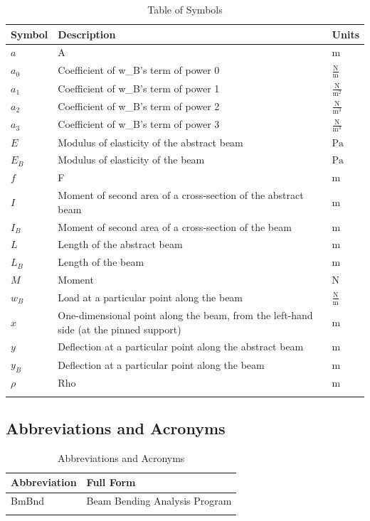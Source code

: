 \documentclass[12pt]{article}
\begin{document}
\begin{longtabu}{l X[l] l}
\toprule
\textbf{Symbol} & \textbf{Description} & \textbf{Units}
\\
\midrule
\endhead
$a$ & A & ${\text{m}}$
\\
${a_{\text{0}}}$ & Coefficient of w\_B's term of power 0 & $\frac{\text{N}}{\text{m}}$
\\
${a_{\text{1}}}$ & Coefficient of w\_B's term of power 1 & $\frac{\text{N}}{\text{m}^{2}}$
\\
${a_{\text{2}}}$ & Coefficient of w\_B's term of power 2 & $\frac{\text{N}}{\text{m}^{3}}$
\\
${a_{\text{3}}}$ & Coefficient of w\_B's term of power 3 & $\frac{\text{N}}{\text{m}^{4}}$
\\
$E$ & Modulus of elasticity of the abstract beam & ${\text{Pa}}$
\\
${E_{B}}$ & Modulus of elasticity of the beam & ${\text{Pa}}$
\\
$f$ & F & ${\text{m}}$
\\
$I$ & Moment of second area of a cross-section of the abstract beam & ${\text{m}}$
\\
${I_{B}}$ & Moment of second area of a cross-section of the beam & ${\text{m}}$
\\
$L$ & Length of the abstract beam & ${\text{m}}$
\\
${L_{B}}$ & Length of the beam & ${\text{m}}$
\\
$M$ & Moment & ${\text{N}}$
\\
${w_{B}}$ & Load at a particular point along the beam & $\frac{\text{N}}{\text{m}}$
\\
$x$ & One-dimensional point along the beam, from the left-hand side (at the pinned support) & ${\text{m}}$
\\
$y$ & Deflection at a particular point along the abstract beam & ${\text{m}}$
\\
${y_{B}}$ & Deflection at a particular point along the beam & ${\text{m}}$
\\
$ρ$ & Rho & ${\text{m}}$
\\
\bottomrule
\caption{Table of Symbols}
\label{Table:ToS}
\end{longtabu}
\subsection{Abbreviations and Acronyms}
\label{Sec:TAbbAcc}
\begin{longtable}{l l}
\toprule
\textbf{Abbreviation} & \textbf{Full Form}
\\
\midrule
\endhead
BmBnd & Beam Bending Analysis Program
\\
\bottomrule
\caption{Abbreviations and Acronyms}
\label{Table:TAbbAcc}
\end{longtable}
\end{document}
